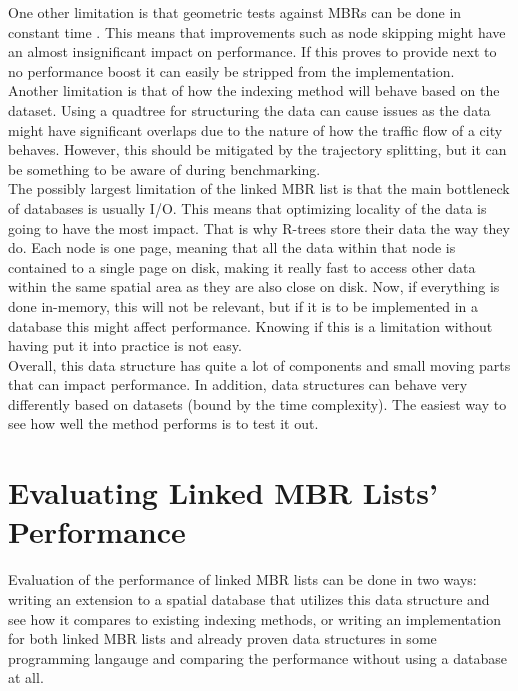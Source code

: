 One other limitation is that geometric tests against MBRs can be done in constant time \cite{spatial_access_methods}. This means that improvements such as node skipping might have an almost insignificant impact on performance. If this proves to provide next to no performance boost it can easily be stripped from the implementation. \\

Another limitation is that of how the indexing method will behave based on the dataset. Using a quadtree for structuring the data can cause issues as the data might have significant overlaps due to the nature of how the traffic flow of a city behaves. However, this should be mitigated by the trajectory splitting, but it can be something to be aware of during benchmarking.  \\

The possibly largest limitation of the linked MBR list is that the main bottleneck of databases is usually I/O.
This means that optimizing locality of the data is going to have the most impact. That is why R-trees store their data the way they do. Each node is one page, meaning that all the data within that node is contained to a single page on disk, making it really fast to access other data within the same spatial area as they are also close on disk. Now, if everything is done in-memory, this will not be relevant, but if it is to be implemented in a database this might affect performance. Knowing if this is a limitation without having put it into practice is not easy. \\

Overall, this data structure has quite a lot of components and small moving parts that can impact performance. In addition, data structures can behave very differently based on datasets (bound by the time complexity). The easiest way to see how well the method performs is to test it out.

\section{Evaluating Linked MBR Lists' Performance}\label{sec:evaluation}
Evaluation of the performance of linked MBR lists can be done in two ways: writing an extension to a spatial database that utilizes this data structure and see how it compares to existing indexing methods, or writing an implementation for both linked MBR lists and already proven data structures in some programming langauge and comparing the performance without using a database at all. \\

